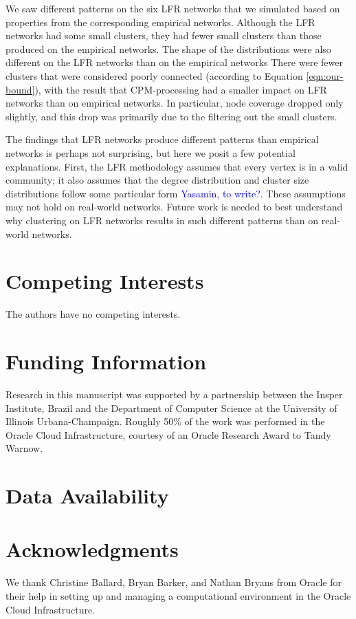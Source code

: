 \documentclass[11pt]{article}   	%
\begin{document}
We saw different patterns on the six LFR networks that we simulated based on properties from the corresponding empirical networks.
Although the LFR networks had some small clusters, they had fewer small clusters than those produced on the empirical networks.
The shape of the distributions were also different on the LFR networks than on the empirical networks There were fewer clusters that were considered poorly connected 
(according to Equation \ref{eqn:our-bound}), with the result that CPM-processing had a smaller impact on LFR networks than on empirical networks.
In particular, node coverage dropped only slightly, and this drop was primarily due to the filtering out the small clusters. 

The findings that LFR networks produce different patterns than empirical networks is perhaps not surprising, but here we posit a few potential explanations.
First, the LFR methodology assumes that every vertex is in a valid community; it also assumes that the degree distribution and cluster size distributions follow some 
particular form \textcolor{blue}{Yasamin, to write?}.
These assumptions may not hold on real-world networks.
Future work is needed to best understand why clustering on LFR networks results in such different patterns than on real-world networks.

\section*{Competing Interests} \vspace{3mm} The authors have no competing interests.

\section*{Funding Information} Research in this manuscript was supported by a partnership between the Insper Institute, Brazil and the Department of Computer Science at the University of Illinois Urbana-Champaign. Roughly
50\% of the work was performed in the Oracle Cloud Infrastructure, courtesy of an Oracle Research Award to Tandy Warnow.

\section*{Data Availability}

\section*{Acknowledgments} We thank Christine Ballard, Bryan Barker, and Nathan Bryans from Oracle for their help in setting up and managing a computational environment in the Oracle Cloud Infrastructure.



\end{document}
